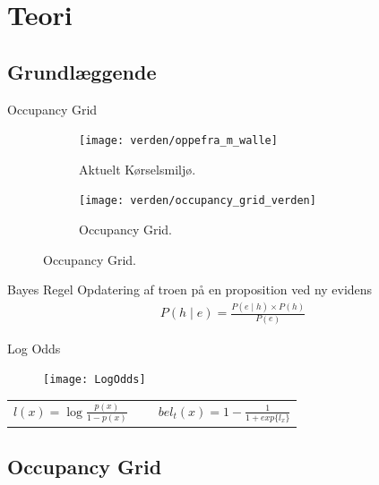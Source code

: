 \section{Teori}
\subsection{Grundlæggende}
\begin{frame}{Occupancy Grid}
\begin{figure}[h] %
\centering
	\begin{subfigure}[b]{.48\textwidth}
	\centering
	\texttt{[image: verden/oppefra\_m\_walle]}
	\caption{Aktuelt Kørselsmiljø.}
	\label{map:world}
	\end{subfigure}
	\hfill
	\begin{subfigure}[b]{.48\textwidth}
	\centering
	\texttt{[image: verden/occupancy\_grid\_verden]}
	\caption{Occupancy Grid.}
	\label{map:occupancy_grid}
	\end{subfigure}

\end{figure}
\end{frame}
\begin{frame}{Bayes Regel}
Opdatering af troen på en proposition ved ny evidens
\[
\begin{split}
P(h \mid e) = \frac{P(e \mid h) \times P(h)}{P(e)}
\end{split}
\]
\end{frame}

\begin{frame}{Log Odds}
\begin{figure}
\centering \texttt{[image: LogOdds]}
\label{logoddsimg}
\end{figure}

%

\begin{tabular}{ p{0.5\linewidth} p{0.5\linewidth} }
$ l(x) = \log \frac{p(x)}{1 - p(x)} $ & 
$ bel_t(x) = 1 - \frac{1}{1 + exp\{l_x\}}\label{logodds:bel} $
\end{tabular}
\end{frame}

\subsection{Occupancy Grid}

